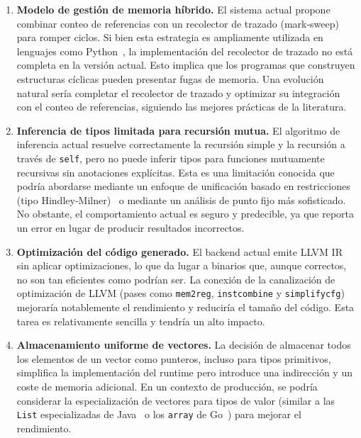 \documentclass[12pt, a4paper]{article}
\begin{document}
\begin{enumerate}[leftmargin=1.4em, itemsep=0.35em]
	\item \textbf{Modelo de gestión de memoria híbrido.} El sistema actual propone combinar conteo de referencias con un recolector de trazado (mark‑sweep) para romper ciclos. Si bien esta estrategia es ampliamente utilizada en lenguajes como Python~\cite{baconrajan2004,baconrajan2001}, la implementación del recolector de trazado no está completa en la versión actual. Esto implica que los programas que construyen estructuras cíclicas pueden presentar fugas de memoria. Una evolución natural sería completar el recolector de trazado y optimizar su integración con el conteo de referencias, siguiendo las mejores prácticas de la literatura.
	
	\item \textbf{Inferencia de tipos limitada para recursión mutua.} El algoritmo de inferencia actual resuelve correctamente la recursión simple y la recursión a través de \texttt{self}, pero no puede inferir tipos para funciones mutuamente recursivas sin anotaciones explícitas. Esta es una limitación conocida que podría abordarse mediante un enfoque de unificación basado en restricciones (tipo Hindley‑Milner)~\cite{milner1978} o mediante un análisis de punto fijo más sofisticado. No obstante, el comportamiento actual es seguro y predecible, ya que reporta un error en lugar de producir resultados incorrectos.
	
	\item \textbf{Optimización del código generado.} El backend actual emite LLVM IR sin aplicar optimizaciones, lo que da lugar a binarios que, aunque correctos, no son tan eficientes como podrían ser. La conexión de la canalización de optimización de LLVM (pases como \texttt{mem2reg}, \texttt{instcombine} y \texttt{simplifycfg}) mejoraría notablemente el rendimiento y reduciría el tamaño del código. Esta tarea es relativamente sencilla y tendría un alto impacto.
	
	\item \textbf{Almacenamiento uniforme de vectores.} La decisión de almacenar todos los elementos de un vector como punteros, incluso para tipos primitivos, simplifica la implementación del runtime pero introduce una indirección y un coste de memoria adicional. En un contexto de producción, se podría considerar la especialización de vectores para tipos de valor (similar a las \texttt{List} especializadas de Java~\cite{gosling2021} o los \texttt{array} de Go~\cite{donovan2015}) para mejorar el rendimiento.
\end{enumerate}
\end{document}
